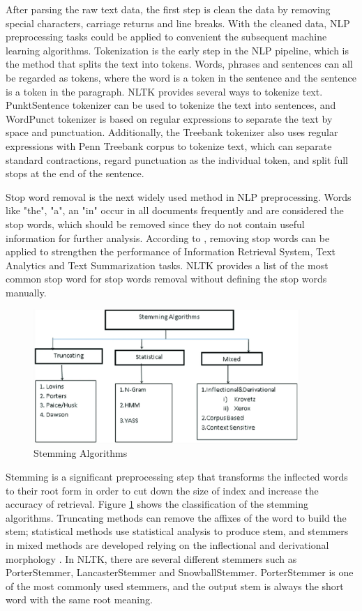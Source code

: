 After parsing the raw text data, the first step is clean the data by removing special characters, carriage returns and line breaks. With the cleaned data, NLP preprocessing tasks could be applied to convenient the subsequent machine learning algorithms. Tokenization is the early step in the NLP pipeline, which is the method that splits the text into tokens. Words, phrases and sentences can all be regarded as tokens, where the word is a token in the sentence and the sentence is a token in the paragraph. NLTK provides several ways to tokenize text. PunktSentence tokenizer can be used to tokenize the text into sentences, and WordPunct tokenizer is based on regular expressions to separate the text by space and punctuation. Additionally, the Treebank tokenizer also uses regular expressions with Penn Treebank corpus to tokenize text, which can separate standard contractions, regard punctuation as the individual token, and split full stops at the end of the sentence. 

Stop word removal is the next widely used method in NLP preprocessing. Words like "the", "a", an "in" occur in all documents frequently and are considered the stop words, which should be removed since they do not contain useful information for further analysis. According to \cite{raulji2016stop}, removing stop words can be applied to strengthen the performance of Information Retrieval System, Text Analytics and Text Summarization tasks. NLTK provides a list of the most common stop word for stop words removal without defining the stop words manually.

 \begin{figure}[H]
    \centering
    \includegraphics[width=0.9\textwidth]{images/stemming.png}
    \caption{Stemming Algorithms \cite{yogish2018review}}
    \label{fig:6}
\end{figure}

Stemming is a significant preprocessing step that transforms the inflected words to their root form in order to cut down the size of index and increase the accuracy of retrieval. Figure \ref{fig:6} shows the classification of the stemming algorithms. Truncating methods can remove the affixes of the word to build the stem; statistical methods use statistical analysis to produce stem, and stemmers in mixed methods are developed relying on the inflectional and derivational morphology \cite{yogish2018review}. In NLTK, there are several different stemmers such as PorterStemmer, LancasterStemmer and SnowballStemmer. PorterStemmer is one of the most commonly used stemmers, and the output stem is always the short word with the same root meaning.


